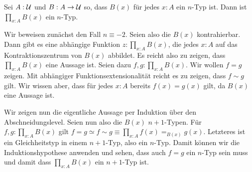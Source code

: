\begin{lemma}
  \label{lem:pi-n-type}
  Sei $A:\mathcal{U}$ und $B:A\to\mathcal{U}$ so, dass $B(x)$ für jedes $x:A$ ein $n$-Typ ist.
  Dann ist $\prod_{x:A}B(x)$ ein $n$-Typ.
\end{lemma}
\begin{beweis}
  Wir beweisen zunächst den Fall $n\equiv -2$. Seien also die $B(x)$ kontrahierbar.
  Dann gibt es eine abhängige Funktion $z:\prod_{x:A}B(x)$, die jedes $x:A$ auf das Kontraktionszentrum von $B(x)$ abbildet.
  Es reicht also zu zeigen, dass $\prod_{x:A}B(x)$ eine Aussage ist.
  Seien dazu $f,g:\prod_{x:A}B(x)$. Wir wollen $f=g$ zeigen.
  Mit abhängiger Funktionsextensionalität reicht es zu zeigen, dass $f\sim g$ gilt.
  Wir wissen aber, dass für jedes $x:A$ bereits $f(x)=g(x)$ gilt, da $B(x)$ eine Aussage ist.

  Wir zeigen nun die eigentliche Aussage per Induktion über den Abschneidungslevel.
  Seien nun also die $B(x)$ $n+1$-Typen.
  Für $f,g:\prod_{x:A}B(x)$ gilt $f=g \simeq f\sim g \equiv \prod_{x:A}f(x)=_{B(x)}g(x)$.
  Letzteres ist ein Gleichheitstyp in einem $n+1$-Typ, also ein $n$-Typ.
  Damit können wir die Induktionshypothese anwenden und sehen, dass auch $f=g$ ein $n$-Typ sein muss und damit dass $\prod_{x:A}B(x)$ ein $n+1$-Typ ist.
\end{beweis}

